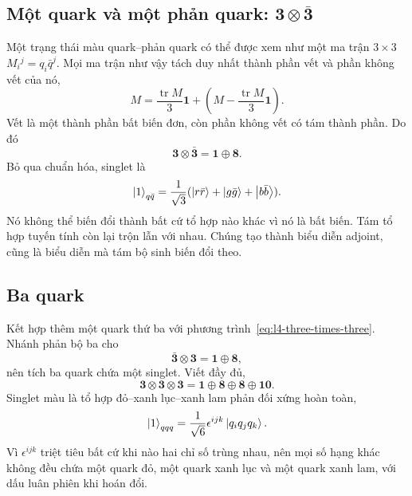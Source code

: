 \subsection{Một quark và một phản quark: \texorpdfstring{\(\boldsymbol 3\otimes\bar{\boldsymbol 3}\)}{3 x phản-3}}

Một trạng thái màu quark--phản quark có thể được xem như một ma trận \(3\times3\) \(M_i{}^j=q_i\bar q^j\). Mọi ma trận như vậy tách duy nhất thành phần vết và phần không vết của nó,
\begin{equation}
M=\frac{\operatorname{tr}M}{3}\boldsymbol 1
+\left(M-\frac{\operatorname{tr}M}{3}\boldsymbol 1\right).
\end{equation}
Vết là một thành phần bất biến đơn, còn phần không vết có tám thành phần. Do đó
\begin{equation}
\boldsymbol 3\otimes\bar{\boldsymbol 3}
=\boldsymbol 1\oplus\boldsymbol 8.
\label{eq:l4-three-times-threebar}
\end{equation}
Bỏ qua chuẩn hóa, singlet là
\begin{equation}
\left\lvert1\right\rangle_{q\bar q}
=\frac{1}{\sqrt3}
(\left\lvert r\bar r\right\rangle+\left\lvert g\bar g\right\rangle+\left\lvert b\bar b\right\rangle).
\end{equation}
Nó không thể biến đổi thành bất cứ tổ hợp nào khác vì nó là bất biến. Tám tổ hợp tuyến tính còn lại trộn lẫn với nhau. Chúng tạo thành biểu diễn adjoint, cũng là biểu diễn mà tám bộ sinh biến đổi theo.

\subsection{Ba quark}

Kết hợp thêm một quark thứ ba với phương trình~\eqref{eq:l4-three-times-three}. Nhánh phản bộ ba cho
\begin{equation}
\bar{\boldsymbol 3}\otimes\boldsymbol 3
=\boldsymbol 1\oplus\boldsymbol 8,
\end{equation}
nên tích ba quark chứa một singlet. Viết đầy đủ,
\begin{equation}
\boldsymbol 3\otimes\boldsymbol 3\otimes\boldsymbol 3
=\boldsymbol 1\oplus\boldsymbol 8\oplus\boldsymbol 8
\oplus\boldsymbol{10}.
\label{eq:l4-three-quark-full}
\end{equation}
Singlet màu là tổ hợp đỏ--xanh lục--xanh lam phản đối xứng hoàn toàn,
\begin{equation}
\left\lvert1\right\rangle_{qqq}
=\frac{1}{\sqrt6}\epsilon^{ijk}\left\lvert q_iq_jq_k\right\rangle.
\label{eq:l4-baryon-singlet}
\end{equation}
Vì \(\epsilon^{ijk}\) triệt tiêu bất cứ khi nào hai chỉ số trùng nhau, nên mọi số hạng khác không đều chứa một quark đỏ, một quark xanh lục và một quark xanh lam, với dấu luân phiên khi hoán đổi.

